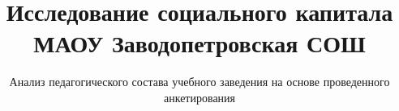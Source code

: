 \title[МАОУ Заводопетровская СОШ] {Исследование социального капитала 
МАОУ Заводопетровская СОШ
}

\subtitle{Анализ педагогического состава учебного заведения 
на основе проведенного анкетирования}
